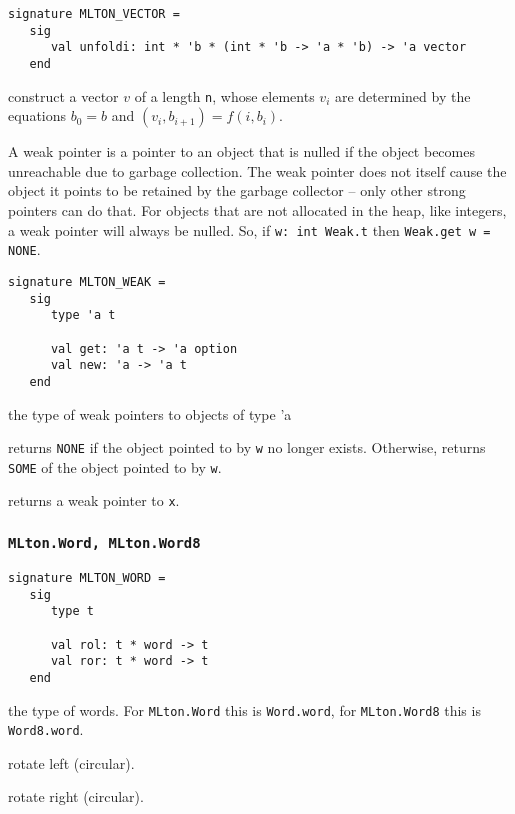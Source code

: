 \begin{verbatim}
signature MLTON_VECTOR =
   sig
      val unfoldi: int * 'b * (int * 'b -> 'a * 'b) -> 'a vector
   end
\end{verbatim}

\begin{description}

construct a vector $v$ of a length {\tt n}, whose elements $v_i$ are determined
by the equations $b_0 = b$ and $(v_i, b_{i+1}) = f (i, b_i)$.

\end{description}

A weak pointer is a pointer to an object that is nulled if the
object becomes unreachable due to garbage collection.  The weak
pointer does not itself cause the object it points to be retained by
the garbage collector -- only other strong pointers can do that.
For objects that are not allocated in the heap, like integers, a weak
pointer will always be nulled.  So, if {\tt w: int Weak.t} then
{\tt Weak.get w = NONE}.
\begin{verbatim}
signature MLTON_WEAK =
   sig
      type 'a t

      val get: 'a t -> 'a option
      val new: 'a -> 'a t
   end
\end{verbatim}

\begin{description}
the type of weak pointers to objects of type 'a

returns {\tt NONE} if the object pointed to by {\tt w} no longer
exists.  Otherwise, returns {\tt SOME} of the object pointed to by
{\tt w}.

returns a weak pointer to {\tt x}.
\end{description}
%
\subsubsection{\tt MLton.Word, MLton.Word8}

\begin{verbatim}
signature MLTON_WORD =
   sig
      type t
         
      val rol: t * word -> t
      val ror: t * word -> t
   end
\end{verbatim}

\begin{description}
the type of words.  For {\tt MLton.Word} this is {\tt Word.word}, for
{\tt MLton.Word8} this is {\tt Word8.word}.

rotate left (circular).

rotate right (circular).
\end{description}


